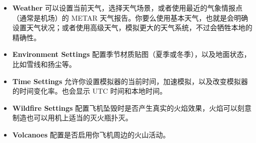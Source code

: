  \begin{itemize}
\ifchinese
\item \textbf{Weather} 可以设置当前天气，选择天气场景，或者使用最近的气象情报点（通常是机场）的 METAR 天气报告。你要么使用基本天气，也就是会明确设置天气状况；或者使用高级天气，模拟更大的天气系统，不过会牺牲本地的精确性。
\item \textbf{Environment Settings} 配置季节材质贴图（夏季或冬季），以及地面状态，比如雪线和扬尘等。
\item \textbf{Time Settings} 允许你设置模拟器的当前时间，加速模拟，以及改变模拟器的时间变化率。也会显示 UTC 时间和本地时间。
\item \textbf{Wildfire Settings} 配置飞机坠毁时是否产生真实的火焰效果，火焰可以刻意制造也可以用机上适当的灭火瓶扑灭。
 \item \textbf{Volcanoes} 配置是否启用你飞机周边的火山活动。
\end{itemize}
\fi

